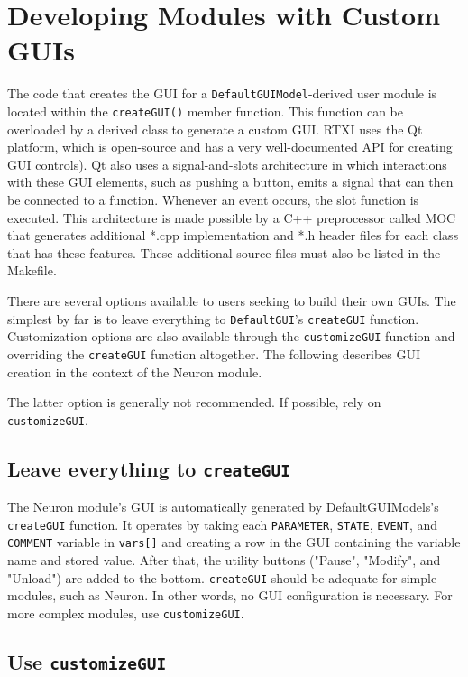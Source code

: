 \section{Developing Modules with Custom GUIs}
\label{Qtmodules}

The code that creates the GUI for a \texttt{DefaultGUIModel}-derived user module is located within the \texttt{createGUI()} member function. This function can be overloaded by a derived class to generate a custom GUI. RTXI uses the Qt platform, which is open-source and has a very well-documented API for creating GUI controls). Qt also uses a signal-and-slots architecture in which interactions with these GUI elements, such as pushing a button, emits a signal that can then be connected to a function. Whenever an event occurs, the slot function is executed. This architecture is made possible by a C++ preprocessor called MOC that generates additional *.cpp implementation and *.h header files for each class that has these features. These additional source files must also be listed in the Makefile.

There are several options available to users seeking to build their own GUIs. The simplest by far is to leave everything to \texttt{DefaultGUI}'s \texttt{createGUI} function. Customization options are also available through the \texttt{customizeGUI} function and overriding the \texttt{createGUI} function altogether. The following describes GUI creation in the context of the Neuron module. 

\attention The latter option is generally not recommended. If possible, rely on \texttt{customizeGUI}. 

\subsection{Leave everything to \texttt{createGUI}}
The Neuron module's GUI is automatically generated by DefaultGUIModels's \texttt{createGUI} function. It operates by taking each \texttt{PARAMETER},  \texttt{STATE}, \texttt{EVENT}, and \texttt{COMMENT} variable in \texttt{vars[]} and creating a row in the GUI containing the variable name and stored value. After that, the utility buttons ("Pause", "Modify", and "Unload") are added to the bottom. \texttt{createGUI} should be adequate for simple modules, such as Neuron. In other words, no GUI configuration is necessary. For more complex modules, use \texttt{customizeGUI}. 

\subsection{Use \texttt{customizeGUI}}

